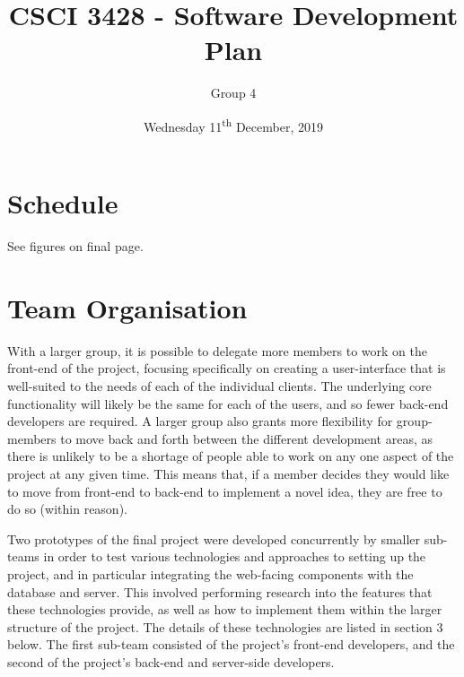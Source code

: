 \documentclass[11pt]{article}
\renewcommand{\headrulewidth}{.3pt}
\renewcommand{\footrulewidth}{.3pt}
\begin{document}
\title{CSCI 3428 - Software Development Plan}
\author{Group 4}
\date{Wednesday 11\textsuperscript{th} December, 2019}
\maketitle

\fancypagestyle{plain}{
\fancyhf{} %
\fancyfoot[r]{\footnotesize \thepage} %
\fancyfoot[l]{\small\scshape SDP} %
\renewcommand{\headrulewidth}{0pt}
\renewcommand{\footrulewidth}{.3pt}}

\section{Schedule}

See figures on final page.

\section{Team Organisation}
With a larger group, it is possible to delegate more members to work on the front-end of the project,
focusing specifically on creating a user-interface that is well-suited to the needs of each of the
individual clients. The underlying core functionality will likely be the same for each of the users,
and so fewer back-end developers are required. A larger group also grants more flexibility for
group-members to move back and forth between the different development areas, as there is unlikely
to be a shortage of people able to work on any one aspect of the project at any given time. This
means that, if a member decides they would like to move from front-end to back-end to implement a
novel idea, they are free to do so (within reason).

Two prototypes of the final project were developed concurrently by smaller sub-teams in order to
test various technologies and approaches to setting up the project, and in particular integrating
the web-facing components with the database and server. This involved performing research into the
features that these technologies provide, as well as how to implement them within the larger
structure of the project. The details of these technologies are listed in section 3 below. The first
sub-team consisted of the project's front-end developers, and the second of the project's back-end
and server-side developers.
\end{document}
